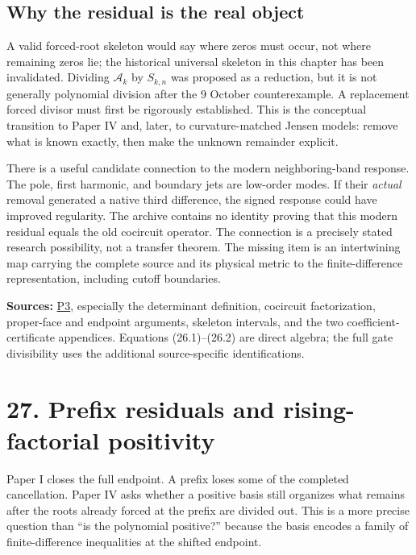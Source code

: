 \documentclass[
  10pt,
  a4paper,
  10pt,
  oneside,
  openany]{book}
\begin{document}
\subsection{Why the residual is the real
object}\label{why-the-residual-is-the-real-object}

A valid forced-root skeleton would say where zeros must occur, not where
remaining zeros lie; the historical universal skeleton in this chapter
has been invalidated. Dividing \(\mathcal A_k\) by \(S_{k,n}\) was
proposed as a reduction, but it is not generally polynomial division
after the 9 October counterexample. A replacement forced divisor must
first be rigorously established. This is the conceptual transition to
Paper IV and, later, to curvature-matched Jensen models: remove what is
known exactly, then make the unknown remainder explicit.

There is a useful candidate connection to the modern neighboring-band
response. The pole, first harmonic, and boundary jets are low-order
modes. If their \emph{actual} removal generated a native third
difference, the signed response could have improved regularity. The
archive contains no identity proving that this modern residual equals
the old cocircuit operator. The connection is a precisely stated
research possibility, not a transfer theorem. The missing item is an
intertwining map carrying the complete source and its physical metric to
the finite-difference representation, including cutoff boundaries.

\textbf{Sources:} \hyperref[source-p3]{P3}, especially the determinant
definition, cocircuit factorization, proper-face and endpoint arguments,
skeleton intervals, and the two coefficient-certificate appendices.
Equations (26.1)--(26.2) are direct algebra; the full gate divisibility
uses the additional source-specific identifications.

\section{27. Prefix residuals and rising-factorial
positivity}\label{ch-rising}

Paper I closes the full endpoint. A prefix loses some of the completed
cancellation. Paper IV asks whether a positive basis still organizes
what remains after the roots already forced at the prefix are divided
out. This is a more precise question than ``is the polynomial
positive?'' because the basis encodes a family of finite-difference
inequalities at the shifted endpoint.
\end{document}
